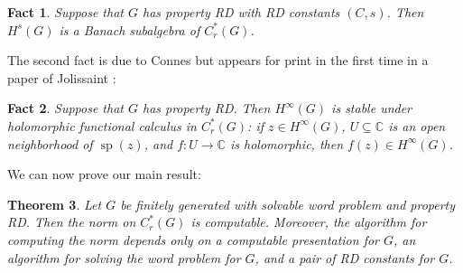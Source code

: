 \documentclass[10pt,a4paper]{amsart}
\DeclareMathOperator{\spec}{sp}
\newcommand{\Cr}{C^*_r(G)}
\theoremstyle{plain}
\newtheorem{theorem}{Theorem}[section]
\newtheorem{fact}[theorem]{Fact}
\theoremstyle{definition}
\numberwithin{equation}{section}
\begin{document}
\begin{fact}\label{fact1}
Suppose that $G$ has property RD with RD constants $(C,s)$.  Then $H^s(G)$ is a Banach subalgebra of $C^*_r(G)$.  
\end{fact}

The second fact is due to Connes but appears for print in the first time in a paper of Jolissaint \cite[Theorem A]{jolissaint2}:

\begin{fact}\label{fact2}
Suppose that $G$ has property RD.  Then $H^\infty(G)$ is stable under holomorphic functional calculus in $\Cr$:  if $z\in H^\infty(G)$, $U\subseteq \mathbb{C}$ is an open neighborhood of $\spec(z)$, and $f:U\to \mathbb{C}$ is holomorphic, then $f(z)\in H^\infty(G)$.
\end{fact}

We can now prove our main result:

\begin{theorem}\label{thm:main}
Let $G$ be finitely generated with solvable word problem and property RD.  Then the norm on $\Cr$ is computable.  Moreover, the algorithm for computing the norm depends only on a computable presentation for $G$, an algorithm for solving the word problem for $G$, and a pair of RD constants for $G$.
\end{theorem}
\end{document}
